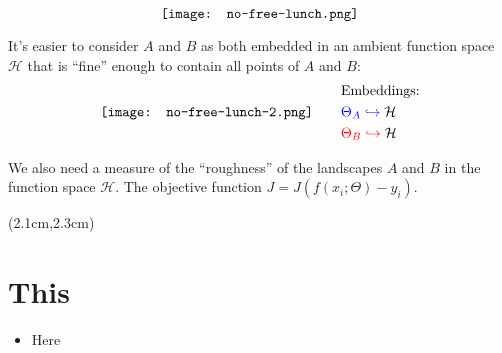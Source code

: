 \begin{preview}
\begin{minipage}{\textwidth}
\begin{equation}
\vcenter{\hbox{\texttt{[image: no-free-lunch.png]}}}
\end{equation}

It's easier to consider $A$ and $B$ as both embedded in an ambient function space $\mathcal{H}$ that is ``fine'' enough to contain all points of $A$ and $B$:
\begin{equation}
\vcenter{\hbox{\texttt{[image: no-free-lunch-2.png]}}} \qquad
\begin{aligned}
& \text{Embeddings:} \\
& {\color{blue}\Theta_A \hookrightarrow} \; \mathcal{H} \\
& {\color{red}\Theta_B \hookrightarrow} \; \mathcal{H} 
\end{aligned}
\end{equation}

We also need a measure of the ``roughness'' of the landscapes $A$ and $B$ in the function space $\mathcal{H}$.  The objective function $ J = J( f(x_i; \Theta) - y_i ) $.

\end{minipage}
\end{preview}

\begin{preview}
\begin{textblock*}{5cm}(2.1cm,2.3cm) %
	{\color{red}{\large \textcircled{\small \themypage}}}
	\addtocounter{mypage}{1}
\end{textblock*}

\begin{minipage}{\textwidth}
	\setlength{\parskip}{0.4\baselineskip}

\section{This}

\begin{itemize}
	\item Here
\end{itemize}

\end{minipage}
\end{preview}

